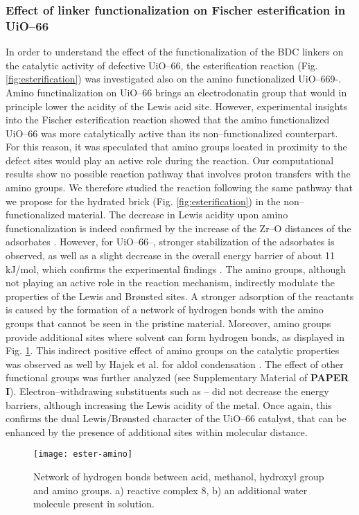 \subsubsection{Effect of linker functionalization on Fischer esterification in UiO--66}
In order to understand the effect of the functionalization of the BDC linkers on the catalytic activity of defective UiO--66, the esterification reaction (Fig. \ref{fig:esterification}) was investigated also on the amino functionalized UiO--669-.  Amino functinalization on UiO--66 brings an electrodonatin group that would in principle lower the acidity of the Lewis acid site. However, experimental insights into the Fischer esterification reaction showed that the amino functionalized UiO--66 was more catalytically active than its non--functionalized counterpart. For this reason, it was speculated that amino groups located in proximity to the defect sites would play an active role during the reaction. Our computational results show no possible reaction pathway that involves proton transfers with the amino groups. We therefore studied the reaction following the same pathway that we propose for the hydrated brick (Fig. \ref{fig:esterification}) in the non--functionalized material. 
\npar
The decrease in Lewis acidity upon amino functionalization is indeed confirmed by the increase of the Zr--O distances of the adsorbates \cite{vermoortele2012electronic}. However, for UiO--66--, stronger stabilization of the adsorbates is observed, as well as a slight decrease in the overall energy barrier of about 11 kJ/mol, which confirms the experimental findings \cite{cirujano2015conversion, cirujano2015zirconium}. The amino groups, although not playing an active role in the reaction mechanism, indirectly modulate the properties of the Lewis and Br\o{}nsted sites. A stronger adsorption of the reactants is caused by the formation of a network of hydrogen bonds with the amino groups that cannot be seen in the pristine material. Moreover, amino groups provide additional sites where solvent can form hydrogen bonds, as displayed in Fig. \ref{fig:ester-amino}. This indirect positive effect of amino groups on the catalytic properties was observed as well by Hajek et al. for aldol condensation \cite{vandichel2015active}. The effect of other functional groups was further analyzed (see Supplementary Material of \textbf{PAPER I}). Electron--withdrawing substituents such as -- did not decrease the energy barriers, although increasing the Lewis acidity of the metal. Once again, this confirms the dual Lewis/Br\o{}nsted character of the UiO--66 catalyst, that can be enhanced by the presence of additional sites within molecular distance. 
\begin{figure}[!htbp]
	\centering
	\texttt{[image: ester-amino]}
	\caption{Network of hydrogen bonds between acid, methanol, hydroxyl group and amino groups. a) reactive complex 8, b) an additional water molecule present in solution.}
	\label{fig:ester-amino}
\end{figure}

